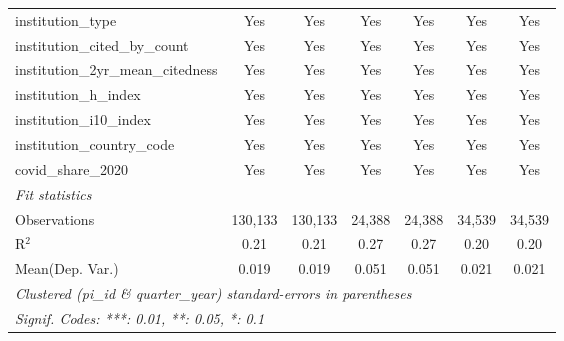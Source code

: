 \begin{tabular}{lcccccc}
   institution\_type                                           & Yes            & Yes            & Yes            & Yes            & Yes            & Yes\\  
   institution\_cited\_by\_count                               & Yes            & Yes            & Yes            & Yes            & Yes            & Yes\\  
   institution\_2yr\_mean\_citedness                           & Yes            & Yes            & Yes            & Yes            & Yes            & Yes\\  
   institution\_h\_index                                       & Yes            & Yes            & Yes            & Yes            & Yes            & Yes\\  
   institution\_i10\_index                                     & Yes            & Yes            & Yes            & Yes            & Yes            & Yes\\  
   institution\_country\_code                                  & Yes            & Yes            & Yes            & Yes            & Yes            & Yes\\  
   covid\_share\_2020                                          & Yes            & Yes            & Yes            & Yes            & Yes            & Yes\\  
   \midrule
   \emph{Fit statistics}\\
   Observations                                                & 130,133        & 130,133        & 24,388         & 24,388         & 34,539         & 34,539\\  
   R$^2$                                                       & 0.21           & 0.21           & 0.27           & 0.27           & 0.20           & 0.20\\  
Mean(Dep. Var.) & 0.019 & 0.019 & 0.051 & 0.051 & 0.021 & 0.021 \\
   \midrule \midrule
   \multicolumn{7}{l}{\emph{Clustered (pi\_id \& quarter\_year) standard-errors in parentheses}}\\
   \multicolumn{7}{l}{\emph{Signif. Codes: ***: 0.01, **: 0.05, *: 0.1}}\\
\end{tabular}
\par\endgroup
